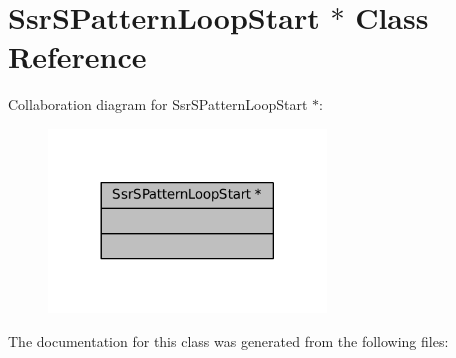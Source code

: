 \hypertarget{classSsrSPatternLoopStart_01_5}{}\section{Ssr\+S\+Pattern\+Loop\+Start $\ast$ Class Reference}
\label{classSsrSPatternLoopStart_01_5}


Collaboration diagram for Ssr\+S\+Pattern\+Loop\+Start $\ast$\+:
\nopagebreak
\begin{figure}[H]
\begin{center}
\leavevmode
\includegraphics[width=209pt]{classSsrSPatternLoopStart_01_5__coll__graph}
\end{center}
\end{figure}


The documentation for this class was generated from the following files\+:
